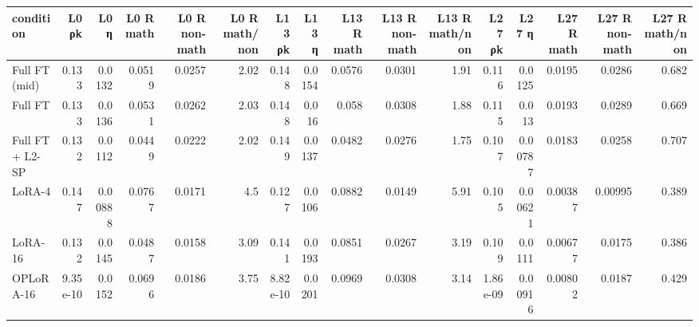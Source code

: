 \begin{tabular}{lrrrrrrrrrrrrrrr}
\toprule
condition & L0 ρk & L0 η & L0 R math & L0 R non-math & L0 R math/non & L13 ρk & L13 η & L13 R math & L13 R non-math & L13 R math/non & L27 ρk & L27 η & L27 R math & L27 R non-math & L27 R math/non \\
\midrule
Full FT (mid) & 0.133 & 0.0132 & 0.0519 & 0.0257 & 2.02 & 0.148 & 0.0154 & 0.0576 & 0.0301 & 1.91 & 0.116 & 0.0125 & 0.0195 & 0.0286 & 0.682 \\
Full FT & 0.133 & 0.0136 & 0.0531 & 0.0262 & 2.03 & 0.148 & 0.016 & 0.058 & 0.0308 & 1.88 & 0.115 & 0.013 & 0.0193 & 0.0289 & 0.669 \\
Full FT + L2-SP & 0.132 & 0.0112 & 0.0449 & 0.0222 & 2.02 & 0.149 & 0.0137 & 0.0482 & 0.0276 & 1.75 & 0.107 & 0.00787 & 0.0183 & 0.0258 & 0.707 \\
LoRA-4 & 0.147 & 0.00888 & 0.0767 & 0.0171 & 4.5 & 0.127 & 0.0106 & 0.0882 & 0.0149 & 5.91 & 0.105 & 0.00621 & 0.00387 & 0.00995 & 0.389 \\
LoRA-16 & 0.132 & 0.0145 & 0.0487 & 0.0158 & 3.09 & 0.141 & 0.0193 & 0.0851 & 0.0267 & 3.19 & 0.109 & 0.0111 & 0.00677 & 0.0175 & 0.386 \\
OPLoRA-16 & 9.35e-10 & 0.0152 & 0.0696 & 0.0186 & 3.75 & 8.82e-10 & 0.0201 & 0.0969 & 0.0308 & 3.14 & 1.86e-09 & 0.00916 & 0.00802 & 0.0187 & 0.429 \\
\bottomrule
\end{tabular}
